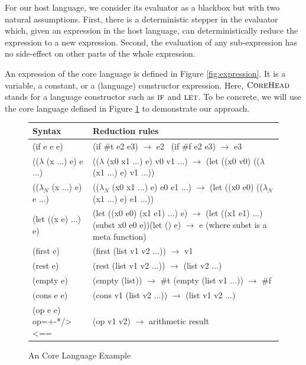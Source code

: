 For our host language, we consider its evaluator as a blackbox  but with two natural assumptions. First, there is a deterministic stepper in the evaluator which, given an expression in the host language, can deterministically reduce the expression to a new expression. Second, the evaluation of any sub-expression has no side-effect on other parts of the whole expression.

An expression of the core language is defined in Figure \ref{fig:expression}. It is a variable, a constant, or a (language) constructor expression. Here, $\mbox{\sc CoreHead}$ stands for a language constructor such as $\mbox{\sc if}$ and $\mbox{\sc let}$. To be concrete, we will use the core language defined in Figure \ref{fig:core} to demonstrate our approach.

\begin{figure}[t]
\begin{center}
\begin{tabularx}{.9\textwidth}%
{|>{\setlength{\hsize}{.4\hsize}\centering\arraybackslash}X  |>{\setlength{\hsize}{1.6\hsize}\centering\arraybackslash}X|}
\hline
Syntax & Reduction rules \\ \hline
(if e e e) &\qquad\qquad\qquad(if \#t e2 e3) $\rightarrow$ e2 \newline ~(if \#f e2 e3) $\rightarrow$ e3\\ \hline
(($\lambda$ (x ...) e) e ...) & (($\lambda$ (x0 x1 ...) e) v0 v1 ...) $\rightarrow$ (let ((x0 v0) (($\lambda$ (x1 ...) e) v1 ...))\\ \hline
(($\lambda_N$ (x ...) e) e ...) & (($\lambda_N$ (x0 x1 ...) e) e0 e1 ...) $\rightarrow$ (let ((x0 e0) (($\lambda_N$ (x1 ...) e) e1 ...))\\ \hline
(let ((x e) ...) e) & (let ((x0 e0) (x1 e1) ...) e) $\rightarrow$ (let ((x1 e1) ...) (subst x0 e0 e))\newline (let () e)  $\rightarrow$ e (where subst is a meta function)\\ \hline
(first e) & (first (list v1 v2 ...)) $\rightarrow$ v1\\ \hline
(rest e) & (rest (list v1 v2 ...)) $\rightarrow$ (list v2 ...)\\ \hline
(empty e) & \qquad\qquad\qquad(empty (list)) $\rightarrow$ \#t \newline (empty (list v1 ...)) $\rightarrow$ \#f\\ \hline
(cons e e) & (cons v1 (list v2 ...)) $\rightarrow$ (list v1 v2 ...)\\ \hline
(op e e) \newline op=+-*/><== & (op v1 v2) $\rightarrow$ arithmetic result\\ \hline
\end{tabularx}
\end{center}
\caption{An Core Language Example}
\label{fig:core}
\end{figure}


